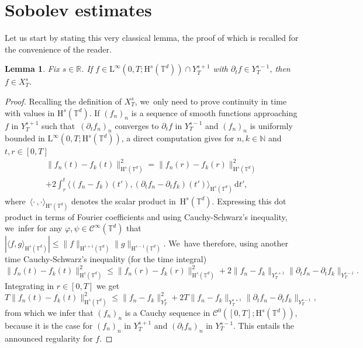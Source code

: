 \documentclass[10pt]{amsart}
\newtheorem{lem}[prop]{Lemma}
\theoremstyle{definition}
\newcommand\R{\mathbb{R}}
\newcommand\N{\mathbb{N}}
\newcommand\T{\mathbb{T}}
\newcommand\dd{\mathrm{d}}
\renewcommand\H{\mathrm{H}}
\renewcommand\L{\mathrm{L}}
\begin{document}
\section{Sobolev estimates}\label{sec:sobo}
Let us start by stating this very classical lemma, the proof of which is recalled for the convenience of the reader.
\begin{lem}\label{lem:sobo1}
Fix $s\in\R$. If $f\in \L^\infty(0,T;\H^s(\T^d)) \cap Y_T^{s+1}$ with $\partial_t f \in Y_T^{s-1}$, then $f\in X_T^s$.
\end{lem}
\begin{proof}
Recalling the definition of $X_T^s$, we~only need to prove continuity in time with values in $\H^s(\T^d)$. If $(f_n)_n$ is a sequence of smooth functions approaching $f$ in $Y_T^{s+1}$ such that~$(\partial_t f_n)_n$ converges to $\partial_t f$ in $Y_T^{s-1}$ and $(f_n)_n$ is uniformly bounded in $\L^\infty(0,T;\H^s(\T^d))$, a direct computation gives for $n,k\in\N$ and $t,r\in[0,T]$
\begin{multline*}
\|f_n(t)-f_k(t)\|_{\H^s(\T^d)}^2 = \|f_n(r)-f_k(r)\|_{\H^s(\T^d)}^2 \\+2 \int_r^t \big\langle (f_n-f_k)(t'),(\partial_t f_n-\partial_t f_k)(t') \big\rangle_{\H^s(\T^d)}\,\dd t',
\end{multline*}
where~$\langle \cdot\,,\cdot \rangle_{\H^s(\T^d)}$ denotes the scalar product in~$\H^s(\T^d)$. Expressing this dot product in terms of Fourier coefficients and using Cauchy-Schwarz's inequality, we~infer for any $\varphi,\psi\in\mathscr{C}^\infty(\T^d)$ that $|\langle f,g\rangle_{\H^s(\T^d)}|\leq \|f\|_{\H^{s+1}(\T^d)}\|g\|_{\H^{s-1}(\T^d)}$. We~have therefore, using another time Cauchy-Schwarz's inequality (for the time integral)
\[
\|f_n(t)-f_k(t)\|_{\H^s(\T^d)}^2 \leq \|f_n(r)-f_k(r)\|_{\H^s(\T^d)}^2 + 2\|f_n-f_k\|_{Y_T^{s+1}}\|\partial_t f_n -\partial_t f_k\|_{Y_T^{s-1}}.
\]
Integrating in $r\in[0,T]$ we get
\[
T\|f_n(t)-f_k(t)\|_{\H^s(\T^d)}^2 \leq \|f_n-f_k\|_{Y_T^s}^2 + 2T \|f_n-f_k\|_{Y_T^{s+1}}\|\partial_t f_n -\partial_t f_k\|_{Y_T^{s-1}},
\]
from which we infer that $(f_n)_n$ is a Cauchy sequence in $\mathscr{C}^0([0,T];\H^s(\T^d))$, because it is the case for $(f_n)_n$ in $Y_T^{s+1}$ and $(\partial_t f_n)_n$ in $Y_T^{s-1}$. This entails the announced regularity for $f$.
\end{proof}
\end{document}
